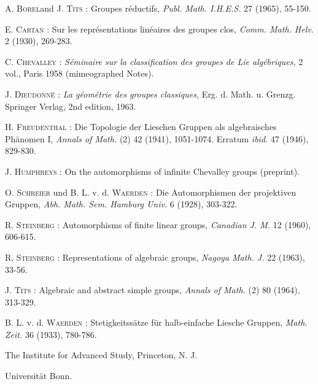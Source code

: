 \begin{thebibliography}{99}
 \textsc{A. Borel}\pageoriginale and \textsc{J. Tits :} Groupes r\'eductifs, {\em Publ. Math. I.H.E.S.} 27 (1965), 55-150.

 \textsc{E. Cartan :} Sur les repr\'esentations lin\'eaires des groupes clos, {\em Comm. Math. Helv.} 2 (1930), 269-283.

 \textsc{C. Chevalley :} {\em S\'eminaire sur la classification des groupes de Lie alg\'ebriques,} 2 vol., Paris 1958 (mimeographed Notes).

 \textsc{J. Dieudonn\'e :} {\em La g\'eom\'etrie des groupes classiques,} Erg. d. Math. u. Grenzg. Springer Verlag, 2nd edition, 1963.

 \textsc{H. Freudenthal :} Die Topologie der Lieschen Gruppen als algebraisches Ph\"anomen I, {\em Annals of Math.} (2) 42 (1941), 1051-1074. Erratum {\em ibid.} 47 (1946), 829-830.

 \textsc{J. Humphreys :} On the automorphisms of infinite Chevalley groups (preprint).

 \textsc{O. Schreier} und B. L. v. d. \textsc{Waerden :} Die Automorphismen der projektiven Gruppen, {\em Abh. Math. Sem. Hamburg Univ.} 6 (1928), 303-322.

 \textsc{R. Steinberg :} Automorphisms of finite linear groups, {\em Canadian J. M.} 12 (1960), 606-615.

 \textsc{R. Steinberg :} Representations of algebraic groups, {\em Nagoya Math. J.} 22 (1963), 33-56.

 \textsc{J. Tits :} Algebraic and abstract simple groups, {\em Annals of Math.} (2) 80 (1964), 313-329.

 B. L. v. d. \textsc{Waerden :} Stetigkeitss\"atze f\"ur halb-einfache Liesche Gruppen, {\em Math. Zeit.} 36 (1933), 780-786.

\end{thebibliography}

\medskip
\noindent
{\small The Institute for Advanced Study, Princeton, N. J.}

\noindent
{\small Universit\"at Bonn.}
